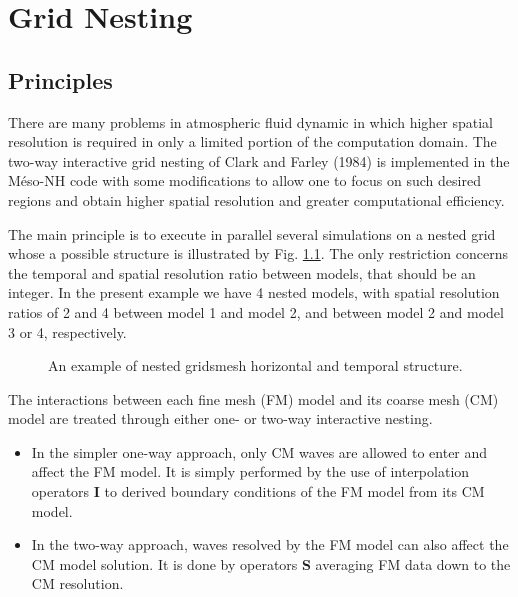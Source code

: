 
\chapter{Grid Nesting}
\minitoc

\section{Principles}

 There are many problems in atmospheric fluid dynamic in which higher spatial
resolution is required in only a limited portion of the computation domain.
 The two-way interactive grid nesting of Clark and Farley (1984)
is implemented in the M\'eso-NH code with some modifications
to allow one to focus on such desired regions
and obtain higher spatial resolution and greater computational efficiency.

 The main principle is to execute in parallel several simulations on a nested
grid whose a possible structure is illustrated by  Fig. \ref{nesting-example}.
The only restriction concerns the temporal and spatial resolution ratio between
models, that should be an integer. In the present example we have 4 nested models,
with spatial resolution ratios of 2 and 4 between model 1 and model 2, and
between model 2 and model 3 or 4, respectively.


\begin{figure}
\caption{An example of nested gridsmesh horizontal and temporal structure.}
\label{nesting-example}
\end{figure}

 The interactions between each fine mesh (FM) model
and its coarse mesh (CM) model are treated through either
one- or two-way interactive nesting.


\begin{itemize}
\item
 In the simpler one-way approach, only CM waves are allowed to enter and affect
the FM model. It is simply performed by the use of interpolation operators
{\bf I} to derived boundary conditions of the FM model from its CM model.
\item
 In the two-way approach, waves resolved by the FM model can also affect
the CM model solution. It is done by operators {\bf S} averaging
FM data down to the CM resolution.
\end{itemize}


